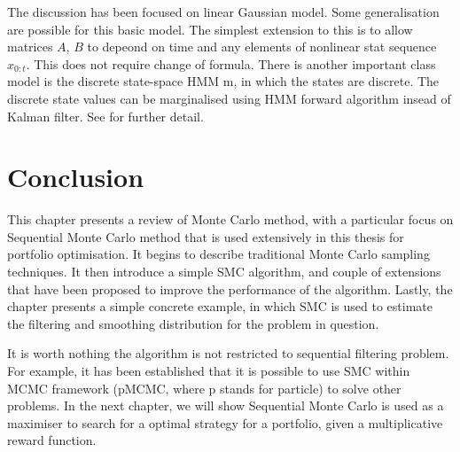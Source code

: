 The discussion has been focused on linear Gaussian model. Some generalisation are possible for this basic model. The simplest extension to this is to allow matrices $A$, $B$ to depeond on time and any elements of nonlinear stat sequence $x_{0:t}$. This does not require change of formula. There is another important class model is the discrete state-space HMM m, in which the states are discrete. The discrete state values can be marginalised using HMM forward algorithm insead of Kalman filter. See \cite{} for further detail.

\section{Conclusion}
This chapter presents a review of Monte Carlo method, with a particular focus on Sequential Monte Carlo method that is used extensively in this thesis for portfolio optimisation. It begins to describe traditional Monte Carlo sampling techniques. It then introduce a simple SMC algorithm, and couple of extensions that have been proposed to improve the performance of the algorithm. Lastly, the chapter presents a simple concrete example, in which SMC is used to estimate the filtering and smoothing distribution for the problem in question.

It is worth nothing the algorithm is not restricted to sequential filtering problem. For example, it has been established that it is possible to use SMC within MCMC framework (pMCMC, where p stands for particle) \cite{CA10} to solve other problems. In the next chapter, we will show Sequential Monte Carlo is used as a maximiser to search for a optimal strategy for a portfolio, given a multiplicative reward function.








\endinput
\section{Markov chain Monte Carlo (MCMC)}

Markov chain Monte Carlo (MCMC) are a set of algorithms that allows ones to draw random samples from the target probability distribution by constructing a ergotic Markov chain process which has its stationary distribution set to be target desired distribution. 

